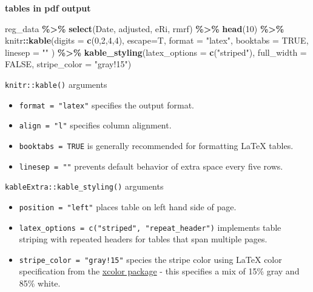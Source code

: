 \documentclass[
  a4paper,
  twoside,
  openright]{book}
\newenvironment{Shaded}{\begin{snugshade}}{\end{snugshade}}
\newcommand{\AttributeTok}[1]{\textcolor[rgb]{0.13,0.29,0.53}{#1}}
\newcommand{\ConstantTok}[1]{\textcolor[rgb]{0.56,0.35,0.01}{#1}}
\newcommand{\DecValTok}[1]{\textcolor[rgb]{0.00,0.00,0.81}{#1}}
\newcommand{\FunctionTok}[1]{\textcolor[rgb]{0.13,0.29,0.53}{\textbf{#1}}}
\newcommand{\NormalTok}[1]{#1}
\newcommand{\SpecialCharTok}[1]{\textcolor[rgb]{0.81,0.36,0.00}{\textbf{#1}}}
\newcommand{\StringTok}[1]{\textcolor[rgb]{0.31,0.60,0.02}{#1}}
\providecommand{\tightlist}{%
  \setlength{\itemsep}{0pt}\setlength{\parskip}{0pt}}
\theoremstyle{definition}
\theoremstyle{definition}
\theoremstyle{definition}
\theoremstyle{definition}
\theoremstyle{remark}
\begin{document}
\textbf{tables in pdf output}

\begin{Shaded}
\begin{Highlighting}[]
\NormalTok{reg\_data }\SpecialCharTok{\%\textgreater{}\%} 
    \FunctionTok{select}\NormalTok{(Date, adjusted, eRi, rmrf) }\SpecialCharTok{\%\textgreater{}\%}
    \FunctionTok{head}\NormalTok{(}\DecValTok{10}\NormalTok{) }\SpecialCharTok{\%\textgreater{}\%} 
\NormalTok{    knitr}\SpecialCharTok{::}\FunctionTok{kable}\NormalTok{(}\AttributeTok{digits =} \FunctionTok{c}\NormalTok{(}\DecValTok{0}\NormalTok{,}\DecValTok{2}\NormalTok{,}\DecValTok{4}\NormalTok{,}\DecValTok{4}\NormalTok{), }\AttributeTok{escape=}\NormalTok{T, }\AttributeTok{format =} \StringTok{"latex"}\NormalTok{, }\AttributeTok{booktabs =} \ConstantTok{TRUE}\NormalTok{, }\AttributeTok{linesep =} \StringTok{""}\NormalTok{ ) }\SpecialCharTok{\%\textgreater{}\%}
    \FunctionTok{kable\_styling}\NormalTok{(}\AttributeTok{latex\_options =} \FunctionTok{c}\NormalTok{(}\StringTok{"striped"}\NormalTok{), }\AttributeTok{full\_width =} \ConstantTok{FALSE}\NormalTok{, }\AttributeTok{stripe\_color =} \StringTok{"gray!15"}\NormalTok{)}
\end{Highlighting}
\end{Shaded}

\texttt{knitr::kable()} arguments

\begin{itemize}
\item
  \texttt{format\ =\ "latex"} specifies the output format.
\item
  \texttt{align\ =\ "l"} specifies column alignment.
\item
  \texttt{booktabs\ =\ TRUE} is generally recommended for formatting LaTeX tables.
\item
  \texttt{linesep\ =\ ""} prevents default behavior of extra space every five rows.
\end{itemize}

\texttt{kableExtra::kable\_styling()} arguments

\begin{itemize}
\tightlist
\item
  \texttt{position\ =\ "left"} places table on left hand side of page.
\item
  \texttt{latex\_options\ =\ c("striped",\ "repeat\_header")} implements table striping with repeated headers for tables that span multiple pages.
\item
  \texttt{stripe\_color\ =\ "gray!15"} species the stripe color using LaTeX color specification from the \href{https://mirror.mwt.me/ctan/macros/latex/contrib/xcolor/xcolor.pdf}{xcolor package} - this specifies a mix of 15\% gray and 85\% white.
\end{itemize}
\end{document}
